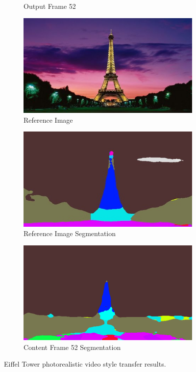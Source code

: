 \documentclass[runningheads]{llncs}
\begin{document}
\begin{figure}[h!]
\begin{subfigure}[t]{0.3\linewidth}
    \caption{Output Frame 52}
\end{subfigure}
\begin{subfigure}[t]{0.3\linewidth}
    \centering
    \includegraphics[width=1\linewidth]{reference_paris.jpg}
    \caption{Reference Image}
\end{subfigure}
\begin{subfigure}[t]{0.3\linewidth}
	\centering
	\includegraphics[width=1\linewidth]{reference_seg_paris.jpg}
	\caption{Reference Image Segmentation}
\end{subfigure}
\begin{subfigure}[t]{0.3\linewidth}
	\centering
	\includegraphics[width=1\linewidth]{out0052.png}
	\caption{Content Frame 52 Segmentation}
\end{subfigure}
\caption{Eiffel Tower photorealistic video style transfer results.}
\end{figure}
\end{document}
